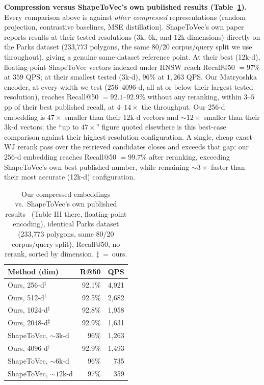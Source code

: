 \documentclass[conference]{IEEEtran}
\begin{document}
\textbf{Compression versus ShapeToVec's own published results (Table~\ref{tab:uncompressed}).}
Every comparison above is against \emph{other compressed} representations (random
projection, contrastive baselines, MSE distillation). ShapeToVec's own paper~\cite{shape2vec}
reports results at their tested resolutions ($3$k, $6$k, and $12$k dimensions) directly
on the Parks dataset (233,773 polygons, the same 80/20 corpus/query split we use
throughout), giving a genuine same-dataset reference point. At their best (12k-d),
floating-point ShapeToVec vectors indexed under HNSW reach Recall@50 $=97\%$ at $359$
QPS; at their smallest tested (3k-d), $96\%$ at $1{,}263$ QPS. Our Matryoshka encoder, at
every width we test ($256$--$4096$-d, all at or below their largest tested
resolution), reaches Recall@50 $=92.1$--$92.9\%$ without any reranking, within
$3$--$5$pp of their best published recall, at $4$--$14\times$ the throughput. Our
256-d embedding is $47\times$ smaller than their 12k-d vectors and ${\sim}12\times$
smaller than their 3k-d vectors; the ``up to $47\times$'' figure quoted elsewhere is
this best-case comparison against their highest-resolution configuration. A single,
cheap exact-WJ rerank
pass over the retrieved candidates closes and exceeds that gap: our 256-d embedding
reaches Recall@50 $=99.7\%$ after reranking, exceeding ShapeToVec's own best published
number, while remaining ${\sim}3\times$ faster than their most accurate (12k-d)
configuration.

\begin{table}[t]\centering
\caption{Our compressed embeddings vs.\ ShapeToVec's own published
results~\cite{shape2vec} (Table III there, floating-point encoding), identical Parks
dataset (233,773 polygons, same 80/20 corpus/query split), Recall@50, no rerank, sorted
by dimension. $\ddagger$~=~ours.}
\label{tab:uncompressed}\setlength{\tabcolsep}{4pt}\small
\begin{tabular}{@{}lrr@{}}
\toprule
Method (dim) & R@50 & QPS \\
\midrule
Ours, 256-d$^\ddagger$  & 92.1\% & 4{,}921 \\
Ours, 512-d$^\ddagger$  & 92.5\% & 2{,}682 \\
Ours, 1024-d$^\ddagger$ & 92.8\% & 1{,}958 \\
Ours, 2048-d$^\ddagger$ & 92.9\% & 1{,}631 \\
ShapeToVec, ${\sim}3$k-d & 96\% & 1{,}263 \\
Ours, 4096-d$^\ddagger$ & 92.9\% & 1{,}493 \\
ShapeToVec, ${\sim}6$k-d & 96\% & 735 \\
ShapeToVec, ${\sim}12$k-d & 97\% & 359 \\
\bottomrule
\end{tabular}
\end{table}
\end{document}
